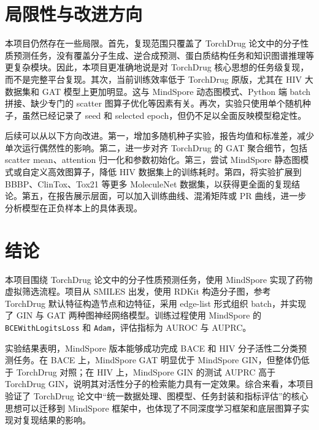\documentclass[12pt,hyperref,a4paper,UTF8]{ctexart}
\begin{document}
\section{局限性与改进方向}

本项目仍然存在一些局限。首先，复现范围只覆盖了 TorchDrug 论文中的分子性质预测任务，没有覆盖分子生成、逆合成预测、蛋白质结构任务和知识图谱推理等更复杂模块。因此，本项目更准确地说是对 TorchDrug 核心思想的任务级复现，而不是完整平台复现。其次，当前训练效率低于 TorchDrug 原版，尤其在 HIV 大数据集和 GAT 模型上更加明显。这与 MindSpore 动态图模式、Python 端 batch 拼接、缺少专门的 scatter 图算子优化等因素有关。再次，实验只使用单个随机种子，虽然已经记录了 seed 和 selected epoch，但仍不足以全面反映模型稳定性。

后续可以从以下方向改进。第一，增加多随机种子实验，报告均值和标准差，减少单次运行偶然性的影响。第二，进一步对齐 TorchDrug 的 GAT 聚合细节，包括 scatter mean、attention 归一化和参数初始化。第三，尝试 MindSpore 静态图模式或自定义高效图算子，降低 HIV 数据集上的训练耗时。第四，将实验扩展到 BBBP、ClinTox、Tox21 等更多 MoleculeNet 数据集，以获得更全面的复现结论。第五，在报告展示层面，可以加入训练曲线、混淆矩阵或 PR 曲线，进一步分析模型在正负样本上的具体表现。

\section{结论}

本项目围绕 TorchDrug 论文中的分子性质预测任务，使用 MindSpore 实现了药物虚拟筛选流程。项目从 SMILES 出发，使用 RDKit 构造分子图，参考 TorchDrug 默认特征构造节点和边特征，采用 edge-list 形式组织 batch，并实现了 GIN 与 GAT 两种图神经网络模型。训练过程使用 MindSpore 的 \texttt{BCEWithLogitsLoss} 和 \texttt{Adam}，评估指标为 AUROC 与 AUPRC。

实验结果表明，MindSpore 版本能够成功完成 BACE 和 HIV 分子活性二分类预测任务。在 BACE 上，MindSpore GAT 明显优于 MindSpore GIN，但整体仍低于 TorchDrug 对照；在 HIV 上，MindSpore GIN 的测试 AUPRC 高于 TorchDrug GIN，说明其对活性分子的检索能力具有一定效果。综合来看，本项目验证了 TorchDrug 论文中“统一数据处理、图模型、任务封装和指标评估”的核心思想可以迁移到 MindSpore 框架中，也体现了不同深度学习框架和底层图算子实现对复现结果的影响。
\end{document}
